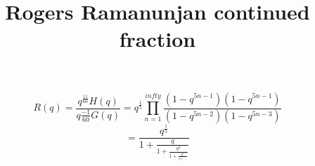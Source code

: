 \documentclass[12pt, a4paper, onecolumn]{article}
\begin{document}
	\title{Rogers Ramanunjan continued fraction}
	\maketitle
	\[
	R(q)=\frac {q^ \frac{11}{60} H(q)}{q
	 \frac{-1}{60}     
	 G(q)}  = q^{\frac{1}{5}}  \prod_{n=1
	 }^{infty}{\frac{(1-q^{5n-1})(1-q^{5n-1})
	 }{(1-q^{5n-2})(1-q^{5n-3})}}\]
	 \[
	 =\frac{q^{\frac{1}{5}}}{1+\frac{q}{1
	 +\frac{q^2
	 }{1+\frac{q^3}{1+\ddots}}}}\]
	
\end{document}
